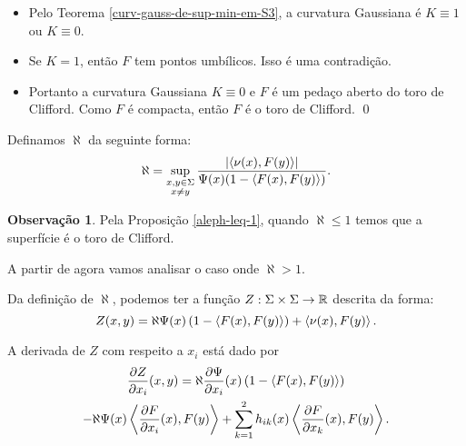 \documentclass[12pt,a4paper]{beamer}
\theoremstyle{definition}
\newtheorem{observacao}{Observação}
\begin{document}
\begin{frame}
	\begin{itemize}
		
		\item Pelo Teorema \ref{curv-gauss-de-sup-min-em-S3}, a curvatura Gaussiana é $K \equiv 1$ ou $K \equiv 0$.
		
		\item Se $K=1$, então $F$ tem pontos umbílicos. 
		Isso é uma contradição.
		
		\item Portanto a curvatura Gaussiana $K \equiv 0$ e $F$ é um pedaço aberto do toro de Clifford.
		Como $F$ é compacta, então $F$ é o toro de Clifford.
		\qed
	\end{itemize}
\end{frame}

\begin{frame}
	Definamos $\aleph$ da seguinte forma:
		\begin{equation*}
			\aleph = \sup_{\substack{x,y \in \Sigma \\ x \neq y}} \frac{\left| \left\langle \nu(x),F(y) \right\rangle \right|}{\Psi(x) (1-\left\langle F(x),F(y) \right\rangle)}.
		\end{equation*}


	\begin{observacao}
		Pela Proposição \ref{aleph-leq-1}, quando $\aleph \leq 1$ temos que a superfície é o toro de Clifford. 
	\end{observacao}
\end{frame}

\begin{frame}

		A partir de agora vamos analisar o caso onde $\aleph > 1$.
	
	
	Da definição de $\aleph$, podemos ter a função $Z: \Sigma \times \Sigma \rightarrow \mathbb R$ descrita da forma:
	\begin{equation*}
		Z(x,y) = \aleph \Psi(x) \left(1 - \left\langle F(x),F(y) \right\rangle \right) + \left\langle \nu(x),F(y) \right\rangle.
	\end{equation*}
	
	A derivada de $Z$ com respeito a $x_i$ está dado por
	\begin{multline*}
		\frac{\partial Z}{\partial x_i}(x,y) = \aleph \frac{\partial \Psi}{\partial x_i}(x) \left( 1 - \left\langle F(x),F(y) \right\rangle \right) \\
		-\aleph \Psi(x) \left\langle \frac{\partial F}{\partial x_i}(x),F(y) \right\rangle + \sum_{k=1}^{2} h_{ik}(x) \left\langle \frac{\partial F}{\partial x_k}(x),F(y) \right\rangle.
	\end{multline*}
	

\end{frame}
\end{document}
